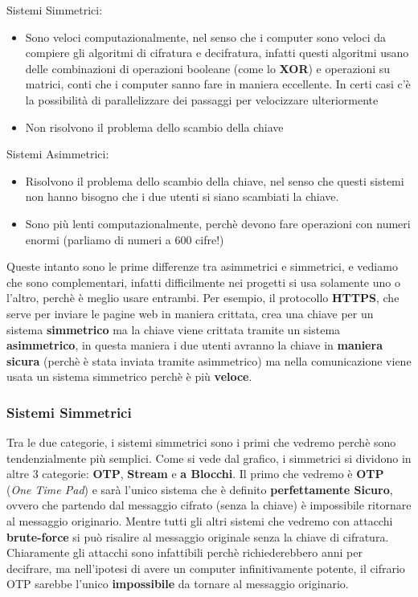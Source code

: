 \documentclass{report}
\begin{document}
Sistemi Simmetrici:

\begin{itemize}
    \item Sono veloci computazionalmente, nel senso che i computer sono veloci da compiere gli algoritmi di cifratura e decifratura, infatti questi algoritmi usano delle combinazioni di operazioni booleane (come lo \textbf{XOR}) e operazioni su matrici, conti che i computer sanno fare in maniera eccellente. In certi casi c'è la possibilità di parallelizzare dei passaggi per velocizzare ulteriormente
    \item Non risolvono il problema dello scambio della chiave 
\end{itemize}

Sistemi Asimmetrici:

\begin{itemize}
    \item Risolvono il problema dello scambio della chiave, nel senso che questi sistemi non hanno bisogno che i due utenti si siano scambiati la chiave.
    \item Sono più lenti computazionalmente, perchè devono fare operazioni con numeri enormi (parliamo di numeri a 600 cifre!)
\end{itemize}


Queste intanto sono le prime differenze tra asimmetrici e simmetrici, e vediamo che sono complementari, infatti difficilmente nei progetti si usa solamente uno o l'altro, perchè è meglio usare entrambi. Per esempio, il protocollo \textbf{HTTPS}, che serve per inviare le pagine web in maniera crittata, crea una chiave per un sistema \textbf{simmetrico} ma la chiave viene crittata tramite un sistema \textbf{asimmetrico}, in questa maniera i due utenti avranno la chiave in \textbf{maniera sicura} (perchè è stata inviata tramite asimmetrico) ma nella comunicazione viene usata un sistema simmetrico perchè è più \textbf{veloce}.

\subsubsection{Sistemi Simmetrici}

Tra le due categorie, i sistemi simmetrici sono i primi che vedremo perchè sono tendenzialmente più semplici. Come si vede dal grafico, i simmetrici si dividono in altre 3 categorie: \textbf{OTP}, \textbf{Stream} e \textbf{a Blocchi}. Il primo che vedremo è \textbf{OTP} (\textit{One Time Pad}) e sarà l'unico sistema che è definito \textbf{perfettamente Sicuro}, ovvero che partendo dal messaggio cifrato (senza la chiave) è impossibile ritornare al messaggio originario. Mentre tutti gli altri sistemi che vedremo con attacchi \textbf{brute-force} si può risalire al messaggio originale senza la chiave di cifratura. Chiaramente gli attacchi sono infattibili perchè richiederebbero anni per decifrare, ma nell'ipotesi di avere un computer infinitivamente potente, il cifrario OTP sarebbe l'unico \textbf{impossibile} da tornare al messaggio originario. 
\end{document}
